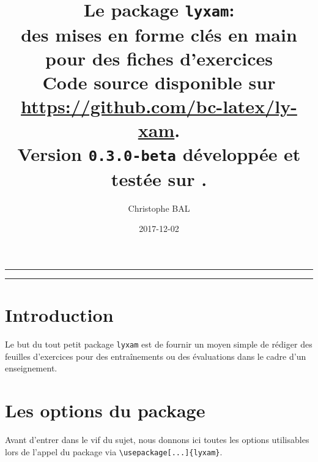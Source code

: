 \documentclass[12pt,a4paper]{scrartcl}
\theoremstyle{definition}
\begin{document}
\renewcommand\labelitemi{\raisebox{0.125em}{\tiny\textbullet}}
\renewcommand{\labelitemii}{---}

\title{%
	Le package \texttt{lyxam}:\\%
	des mises en forme clés en main\\%
	pour des fiches d'exercices\\%
	{\footnotesize Code source disponible sur \url{https://github.com/bc-latex/ly-xam}.}\\%
	{\footnotesize Version \texttt{0.3.0-beta} développée et testée sur \macosxname{}.}%
}
\author{Christophe BAL}
\date{2017-12-02}

\maketitle


\vspace{2em}

\hrule

\tableofcontents

\vspace{1.5em}

\hrule

\newpage



\section{Introduction}

Le but du tout petit package \verb+lyxam+ est de fournir un moyen simple de rédiger des feuilles d'exercices pour des entraînements ou des évaluations dans le cadre d'un enseignement.




\section{Les options du package}

Avant d'entrer dans le vif du sujet, nous donnons ici toutes les options utilisables lors de l'appel du package via \verb+\usepackage[...]{lyxam}+.
\end{document}
